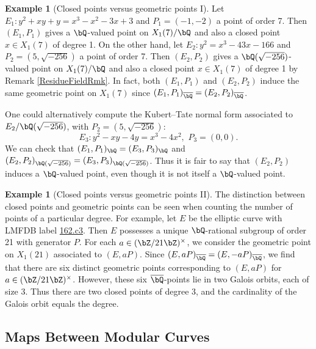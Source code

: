 \documentclass[11pt,reqno]{amsart}
\theoremstyle{plain}
\theoremstyle{definition}
\newtheorem{example}[theorem]{Example}
\newcommand{\Q}{\bQ}
\newcommand{\Z}{\bZ}
\begin{document}
\begin{example}[Closed points versus geometric points I]
Let $E_1\colon y^2+xy+y=x^3-x^2-3x+3$ and $P_1=(-1,-2)$ a point of order 7. Then $(E_1,P_1)$ gives a $\Q$-valued point on $X_1(7)/\Q$ and also a closed point $x\in X_1(7)$ of degree 1. On the other hand, let $E_2\colon y^2=x^3-43x-166$ and $P_2=(5,\sqrt{-256})$ a point of order 7. Then $(E_2,P_2)$ gives a $\Q(\sqrt{-256})$-valued point on $X_1(7)/\Q$ and also a closed point $x\in X_1(7)$ of degree 1 by Remark \ref{ResidueFieldRmk}. In fact, both $(E_1,P_1)$ and $(E_2,P_2)$ induce the same geometric point on $X_1(7)$ since $(E_1,P_1)_{\overline{\Q}}=(E_2,P_2)_{\overline{\Q}}$.

One could alternatively compute the Kubert--Tate normal form associated to $E_2/\Q(\sqrt{-256})$, with $P_2=(5,\sqrt{-256})$:
\[
    E_3\colon y^2-xy-4y=x^3-4x^2,\, \, P_3=(0,0).
\]
We can check that $(E_1,P_1)_{\Q}=(E_3,P_3)_{\Q}$ and $(E_2,P_2)_{{\Q(\sqrt{-256})}} =(E_3,P_3)_{{\Q(\sqrt{-256})}}$. Thus it is fair to say that $(E_2,P_2)$ induces a $\Q$-valued point, even though it is not itself a $\Q$-valued point.
\end{example}

\begin{example}[Closed points versus geometric points II]
The distinction between closed points and geometric points can be seen when counting the number of points of a particular degree. For example, let $E$ be the elliptic curve with LMFDB label \href{https://www.lmfdb.org/EllipticCurve/Q/162/c/3}{162.c3}. Then $E$ possesses a unique $\Q$-rational subgroup of order 21 with generator $P$. For each $a \in (\Z/21\Z)^{\times}$, we consider the geometric point on $X_1(21)$ associated to $(E,aP)$. Since $(E,aP)_{\overline{\Q}}=(E,-aP)_{\overline{\Q}}$, we find that there are six distinct geometric points corresponding to $(E,aP)$ for $a \in (\Z/21\Z)^{\times}$. However, these six $\overline{\Q}$-points lie in two Galois orbits, each of size 3. Thus there are two closed points of degree 3, and the cardinality of the Galois orbit equals the degree.
\end{example}


\subsection{Maps Between Modular Curves}
\end{document}
